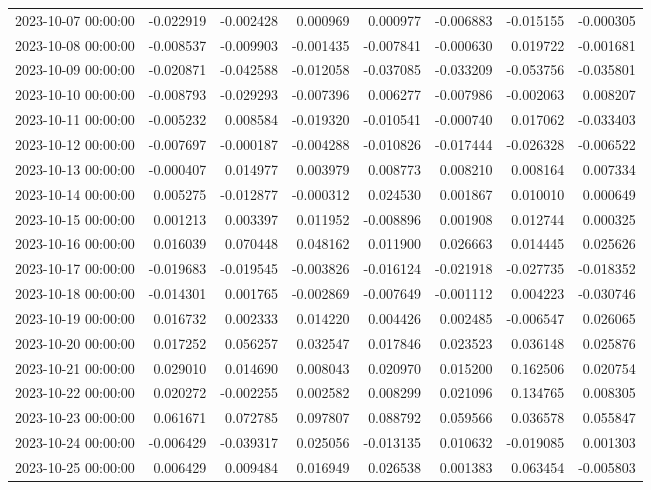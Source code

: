 \begin{tabular}{lrrrrrrr}
2023-10-07 00:00:00 & -0.022919 & -0.002428 & 0.000969 & 0.000977 & -0.006883 & -0.015155 & -0.000305 \\
2023-10-08 00:00:00 & -0.008537 & -0.009903 & -0.001435 & -0.007841 & -0.000630 & 0.019722 & -0.001681 \\
2023-10-09 00:00:00 & -0.020871 & -0.042588 & -0.012058 & -0.037085 & -0.033209 & -0.053756 & -0.035801 \\
2023-10-10 00:00:00 & -0.008793 & -0.029293 & -0.007396 & 0.006277 & -0.007986 & -0.002063 & 0.008207 \\
2023-10-11 00:00:00 & -0.005232 & 0.008584 & -0.019320 & -0.010541 & -0.000740 & 0.017062 & -0.033403 \\
2023-10-12 00:00:00 & -0.007697 & -0.000187 & -0.004288 & -0.010826 & -0.017444 & -0.026328 & -0.006522 \\
2023-10-13 00:00:00 & -0.000407 & 0.014977 & 0.003979 & 0.008773 & 0.008210 & 0.008164 & 0.007334 \\
2023-10-14 00:00:00 & 0.005275 & -0.012877 & -0.000312 & 0.024530 & 0.001867 & 0.010010 & 0.000649 \\
2023-10-15 00:00:00 & 0.001213 & 0.003397 & 0.011952 & -0.008896 & 0.001908 & 0.012744 & 0.000325 \\
2023-10-16 00:00:00 & 0.016039 & 0.070448 & 0.048162 & 0.011900 & 0.026663 & 0.014445 & 0.025626 \\
2023-10-17 00:00:00 & -0.019683 & -0.019545 & -0.003826 & -0.016124 & -0.021918 & -0.027735 & -0.018352 \\
2023-10-18 00:00:00 & -0.014301 & 0.001765 & -0.002869 & -0.007649 & -0.001112 & 0.004223 & -0.030746 \\
2023-10-19 00:00:00 & 0.016732 & 0.002333 & 0.014220 & 0.004426 & 0.002485 & -0.006547 & 0.026065 \\
2023-10-20 00:00:00 & 0.017252 & 0.056257 & 0.032547 & 0.017846 & 0.023523 & 0.036148 & 0.025876 \\
2023-10-21 00:00:00 & 0.029010 & 0.014690 & 0.008043 & 0.020970 & 0.015200 & 0.162506 & 0.020754 \\
2023-10-22 00:00:00 & 0.020272 & -0.002255 & 0.002582 & 0.008299 & 0.021096 & 0.134765 & 0.008305 \\
2023-10-23 00:00:00 & 0.061671 & 0.072785 & 0.097807 & 0.088792 & 0.059566 & 0.036578 & 0.055847 \\
2023-10-24 00:00:00 & -0.006429 & -0.039317 & 0.025056 & -0.013135 & 0.010632 & -0.019085 & 0.001303 \\
2023-10-25 00:00:00 & 0.006429 & 0.009484 & 0.016949 & 0.026538 & 0.001383 & 0.063454 & -0.005803 \\

\end{tabular}
